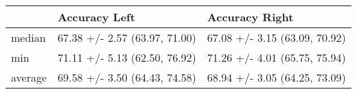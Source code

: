 \begin{tabular}{lll}
\toprule
{} &                  Accuracy Left &                 Accuracy Right \\
\midrule
median  &  67.38 +/- 2.57 (63.97, 71.00) &  67.08 +/- 3.15 (63.09, 70.92) \\
min     &  71.11 +/- 5.13 (62.50, 76.92) &  71.26 +/- 4.01 (65.75, 75.94) \\
average &  69.58 +/- 3.50 (64.43, 74.58) &  68.94 +/- 3.05 (64.25, 73.09) \\
\bottomrule
\end{tabular}
